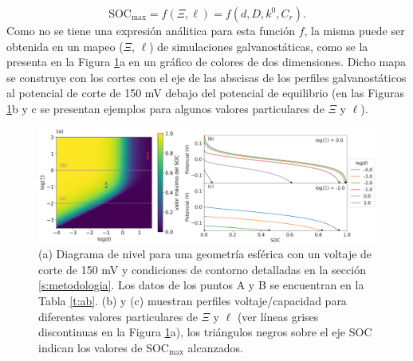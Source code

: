 \begin{equation}\label{eq:socmax}
    \text{SOC}_{\max} = f(\Xi, \ell) = f(d, D, k^0, C_r).
\end{equation}
Como no se tiene una expresión análitica para esta función $f$, la misma puede ser 
obtenida en un mapeo ($\Xi$, $\ell$) de simulaciones galvanostáticas, como se la 
presenta en la Figura \ref{fig:diagnostico}a en un gráfico de colores de dos 
dimensiones. Dicho mapa se construye con los cortes con el eje de las abscisas de los perfiles galvanostáticos
al potencial de corte de 150 mV debajo del potencial de equilibrio (en las Figuras 
\ref{fig:diagnostico}b y c se presentan ejemplos para algunos valores particulares 
de $\Xi$ y $\ell$).
\begin{figure}[h!]
    \centering
    \includegraphics[width=\textwidth]{FastCharging/un/introduccion/diagnosis-merged.png}
    \caption{(a) Diagrama de nivel para una geometría esférica con un voltaje de 
    corte de 150 mV y condiciones de contorno detalladas en la sección 
    \ref{s:metodologia}. Los datos de los puntos A y B se encuentran en la 
    Tabla \ref{t:ab}. (b) y (c) muestran perfiles voltaje/capacidad para 
    diferentes valores particulares de $\Xi$ y $\ell$ (ver líneas grises 
    discontinuas en la Figura \ref{fig:diagnostico}a), los triángulos negros 
    sobre el eje SOC indican los valores de SOC$_{\max}$ alcanzados.}
    \label{fig:diagnostico}
\end{figure}

